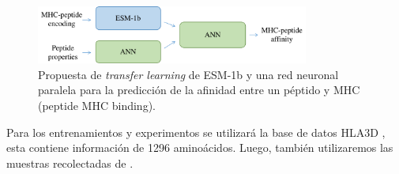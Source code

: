\begin{figure}[H]
	\centering
	\includegraphics[width=0.8\textwidth]{img/neoantigen/proposal}	
	\caption{Propuesta de \textit{transfer learning} de ESM-1b y una red neuronal paralela para la predicción de la afinidad entre un péptido y MHC (peptide MHC binding).}
	\label{fig:proposal}
\end{figure}


Para los entrenamientos y experimentos se utilizará la base de datos HLA3D \citep{li2022hla3d}, esta contiene información de 1296 aminoácidos. Luego, también utilizaremos las muestras recolectadas de \cite{hashemi2022improved}.

